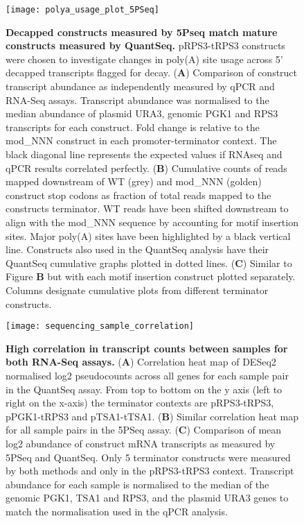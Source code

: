 \documentclass[../main.tex]{subfiles}
\begin{document}
\begin{figure}[h!]

{\centering \texttt{[image: polya\_usage\_plot\_5PSeq]} 

}

\caption[Decapped constructs measured by 5Pseq match mature constructs measured by QuantSeq.]{\textbf{Decapped constructs measured by 5Pseq match mature constructs measured by QuantSeq.} pRPS3-tRPS3 constructs were chosen to investigate changes in poly(A) site usage across 5' decapped transcripts flagged for decay. (\textbf{A}) Comparison of construct transcript abundance as independently measured by qPCR and RNA-Seq assays. Transcript abundance was normalised to the median abundance of  plasmid URA3, genomic PGK1 and RPS3 transcripts for each construct. Fold change is relative to the mod\_NNN construct in each promoter-terminator context. The black diagonal line represents the expected values if RNAseq and qPCR results correlated perfectly. (\textbf{B}) Cumulative counts of reads mapped downstream of WT (grey) and mod\_NNN (golden) construct stop codons as fraction of total reads mapped to the constructs terminator. WT reads have been shifted downstream to align with the mod\_NNN sequence by accounting for motif insertion sites. Major poly(A) sites have been highlighted by a black vertical line. Constructs also used in the QuantSeq analysis have their QuantSeq cumulative graphs plotted in dotted lines. (\textbf{C}) Similar to Figure \textbf{B} but with each motif insertion construct plotted separately. Columns designate cumulative plots from different terminator constructs.}\label{fig:polyA-site-usage-5Pseq}
\end{figure}

\begin{figure}[h!]

{\centering \texttt{[image: sequencing\_sample\_correlation]} 

}

\caption[High correlation in transcript counts between samples for both RNA-Seq assays.]{\textbf{High correlation in transcript counts between samples for both RNA-Seq assays.} (\textbf{A}) Correlation heat map of DESeq2 normalised log2 pseudocounts across all genes for each sample pair in the QuantSeq assay. From top to bottom on the y axis (left to right on the x-axis) the terminator contexts are pRPS3-tRPS3, pPGK1-tRPS3 and pTSA1-tTSA1. (\textbf{B}) Similar correlation heat map for all sample pairs in the 5PSeq assay. (\textbf{C}) Comparison of mean log2 abundance of construct mRNA transcripts as measured by 5PSeq and QuantSeq. Only 5 terminator constructs were measured by both methods and only in the pRPS3-tRPS3 context. Transcript abundance for each sample is normalised to the median of the genomic PGK1, TSA1 and RPS3, and the plasmid URA3 genes to match the normalisation used in the qPCR analysis.}\label{fig:rnaseq-QC-correlation}
\end{figure}
\end{document}
